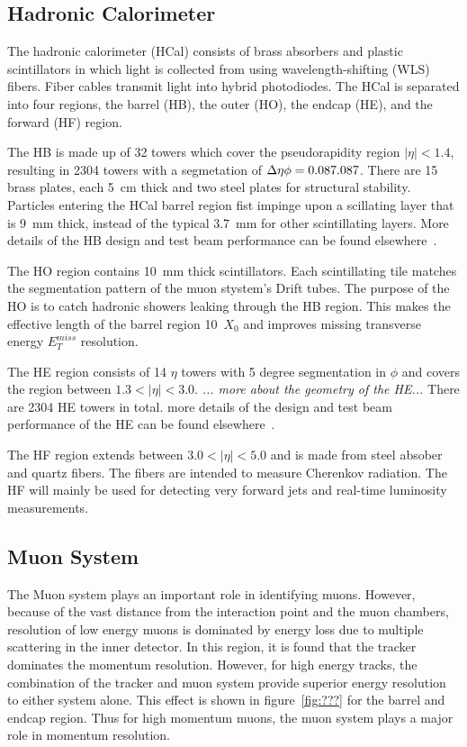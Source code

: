 \subsection{Hadronic Calorimeter}
\label{sec:HCal}

The hadronic calorimeter (HCal) consists of brass absorbers and plastic 
scintillators
in which light is collected from using wavelength-shifting (WLS) fibers. 
Fiber cables transmit light into hybrid photodiodes.  The HCal is separated
into four regions, the barrel (HB), the outer (HO), the endcap (HE), 
and the forward (HF) region.

The HB is made up of 32 towers which cover the pseudorapidity region 
$|\eta|<1.4$, resulting in 2304 towers with a segmetation of 
$\Delta\eta\time\Delta\phi=0.087\time0.087$.  There are 15 brass plates, 
each 5~cm thick and two steel plates for structural stability. Particles 
entering the HCal barrel region fist impinge upon a scillating layer that
is 9~mm thick, instead of the typical 3.7~mm for other scintillating layers.
More details of the HB design and test beam performance can be found
elsewhere~\cite{??}.

The HO region contains 10~mm thick scintillators.  Each scintillating tile
matches the segmentation pattern of the muon stystem's Drift tubes.  
The purpose of the HO is to catch hadronic showers leaking through the 
HB region. This makes the effective length of the barrel region 10~$X_0$
and improves missing transverse energy $E_T^{miss}$ resolution.

The HE region consists of 14 $\eta$ towers with 5 degree segmentation in 
$\phi$ and covers the region between $1.3<|\eta|<3.0$. {\it ... more about the
geometry of the HE...} There are 2304 HE towers in total.  more details of
the design and test beam performance of the HE can be found 
elsewhere~\cite{??}.

The HF region extends between $3.0<|\eta|<5.0$ and is made from steel absober
and quartz fibers.  The fibers are intended to measure Cherenkov radiation.  
The HF will mainly be used for detecting very forward jets and real-time
luminosity measurements.  

\subsection{Muon System}
\label{sec:Muon System}

The Muon system plays an important role in identifying muons.  However, 
because of the vast distance from the interaction point and the muon 
chambers, resolution of low energy muons is dominated by energy loss 
due to multiple scattering in the inner detector.  In this region, it 
is found that the tracker dominates the momentum resolution.  However, 
for high energy tracks, the combination of the tracker and muon system
provide superior energy resolution to either system alone.  This effect
is shown in figure~\ref{fig:???} for the barrel and endcap region.  Thus
for high momentum muons, the muon system plays a major role in momentum 
resolution. 

